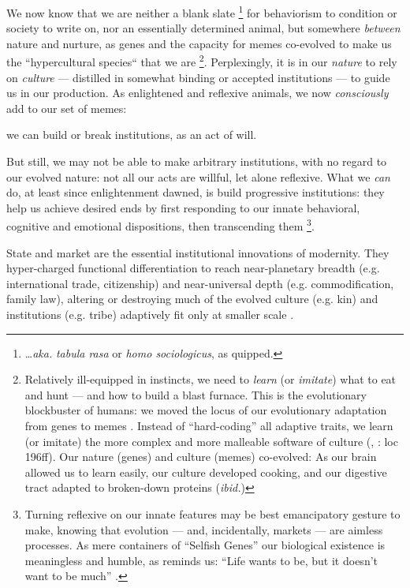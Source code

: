 \documentclass[11pt,a4paper,oneside,openright]{article}
\begin{document}
\begin{enumerate}
	We now know that we are neither a blank slate
		\footnote{
			\ldots \emph{aka.} \emph{tabula rasa} or \emph{homo sociologicus}, as \cite{Dahrendorf1965} quipped.
		} 
	for behaviorism to condition or society to write on, nor an essentially determined animal, but somewhere \emph{between} nature and nurture, as genes and the capacity for memes \citep{Dawkins1976} co-evolved to make us the ``hypercultural species`` that we are  \citep[loc 175]{Henrich2007}
	\footnote
		{Relatively ill-equipped in instincts, we need to \emph{learn} (or \emph{imitate}) what to eat and hunt --- and how to build a blast furnace. 
		This is the evolutionary blockbuster of humans: 
		we moved the locus of our evolutionary adaptation from genes to memes \citep{Dawkins1976}. 
		Instead of ``hard-coding'' all adaptive traits, we learn (or imitate) the more complex and more malleable software of culture (\citealt{Boyd1985}, \citealt{Henrich2007}: loc 196ff). 
		Our nature (genes) and culture (memes) co-evolved: 
		As our brain allowed us to learn easily, our culture developed cooking, and our digestive tract adapted to broken-down proteins (\emph{ibid.})
	}. 
	Perplexingly, it is in our \emph{nature} to rely on \emph{culture}  --- distilled in somewhat binding or accepted institutions --- to guide us in our production. 
	As enlightened and reflexive animals, we now \emph{consciously} add to our set of memes: 
	
	we can build or break institutions, as an act of will. 
	
	But still, we may not be able to make arbitrary institutions, with no regard to our evolved nature: 
	not all our acts are willful, let alone reflexive. 
	What we \emph{can} do, at least since enlightenment dawned, is build progressive institutions: 
	they help us achieve desired ends by first responding to our innate behavioral, cognitive and emotional dispositions, then transcending them
		\footnote{
			Turning reflexive on our innate features may be best emancipatory gesture to make, knowing that evolution --- and, incidentally, markets --- are aimless processes. 
			As mere containers of ``Selfish Genes'' \citep{Dawkins1976} our biological existence is meaningless and humble, as \citeauthor{Bryson2003} reminds us: 
			``Life wants to be, but it doesn't want to be much'' \citeyearpar{Bryson2003}.
		}.
	
	State and market are the essential institutional innovations of modernity. 
	They hyper-charged functional differentiation to reach near-planetary breadth (e.g. international trade, citizenship) and near-universal depth (e.g. commodification, family law), altering or destroying much of the evolved culture (e.g. kin) and institutions (e.g. tribe) adaptively fit only at smaller scale \citep{Diamond1997}. 
	

\end{enumerate}
\end{document}
